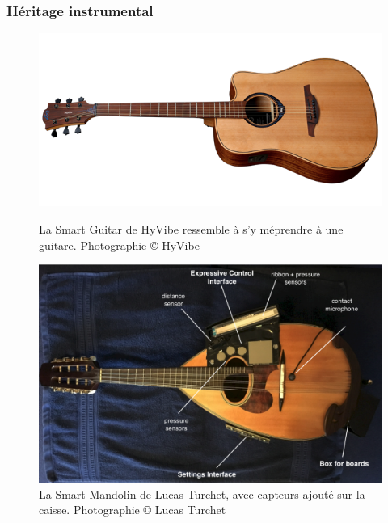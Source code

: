 \subsubsection{Héritage instrumental}
\label{sec:interfaces:heritages:instrument}
\begin{figure}[!htbp]
	\captionsetup{format=plain}%
	\centering
	\begin{minipage}[t]{0.48\textwidth}
		\includegraphics[width=\linewidth]{gfx/05_interfaces/HyVibe-guitar.png}
		\caption[La Smart Guitar de HyVibe]{La Smart Guitar de HyVibe ressemble à s'y méprendre à une guitare. Photographie © HyVibe}
		\label{fig:interface:hyvibe}
	\end{minipage}
	\hspace{.02\linewidth}
	\begin{minipage}[t]{0.48\textwidth}
	    \includegraphics[width=\linewidth]{gfx/05_interfaces/Turchet-SmartMandolin.png}
		\caption[La Smart Mandolin de Lucas Turchet]{La Smart Mandolin de Lucas Turchet, avec capteurs ajouté sur la caisse. Photographie © Lucas Turchet}
		\label{fig:interface:smart-mandolin}
	\end{minipage}
\end{figure}
